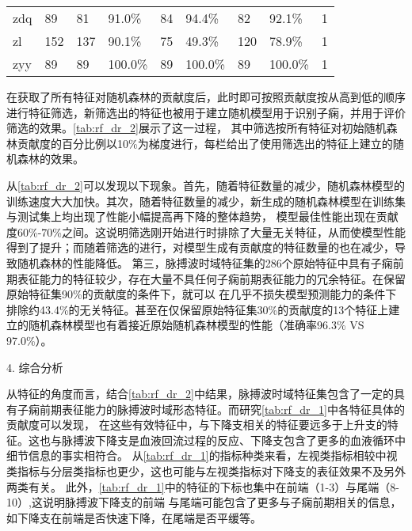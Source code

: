 \begin{landscape}
\begin{longtable}{m{2cm}<{\centering}m{2cm}<{\centering}m{2cm}<{\centering}m{2cm}<{\centering}m{2cm}<{\centering}m{2cm}<{\centering}m{2cm}<{\centering}m{2cm}<{\centering}m{2cm}<{\centering}}
            zdq                   & 89                    & 81         & 91.0\%     & 84         & 94.4\%     & 82         & 92.1\%      & 1                                                                      \\
            zl                    & 152                   & 137        & 90.1\%     & 75         & 49.3\%     & 120        & 78.9\%      & 1                                                                      \\
            zyy                   & 89                    & 89         & 100.0\%    & 89         & 100.0\%    & 89         & 100.0\%     & 1                                                                       \\    
      \end{longtable}
\end{landscape}

在获取了所有特征对随机森林的贡献度后，此时即可按照贡献度按从高到低的顺序进行特征筛选，新筛选出的特征也被用于建立随机模型用于识别子痫，并用于评价筛选的效果。\autoref{tab:rf_dr_2}展示了这一过程，
其中筛选按所有特征对初始随机森林贡献度的百分比例以10\%为梯度进行，每栏给出了使用筛选出的特征上建立的随机森林的效果。

从\autoref{tab:rf_dr_2}可以发现以下现象。首先，随着特征数量的减少，随机森林模型的训练速度大大加快。其次，随着特征数量的减少，新生成的随机森林模型在训练集与测试集上均出现了性能小幅提高再下降的整体趋势，
模型最佳性能出现在贡献度60\%-70\%之间。这说明筛选刚开始进行时排除了大量无关特征，从而使模型性能得到了提升；而随着筛选的进行，对模型生成有贡献度的特征数量的也在减少，导致随机森林的性能降低。
第三，脉搏波时域特征集的286个原始特征中具有子痫前期表征能力的特征较少，存在大量不具任何子痫前期表征能力的冗余特征。在保留原始特征集90\%的贡献度的条件下，就可以
在几乎不损失模型预测能力的条件下排除约43.4\%的无关特征。甚至在仅保留原始特征集30\%的贡献度的13个特征上建立的随机森林模型也有着接近原始随机森林模型的性能（准确率96.3\% VS 97.0\%）。

4. 综合分析

从特征的角度而言，结合\autoref{tab:rf_dr_2}中结果，脉搏波时域特征集包含了一定的具有子痫前期表征能力的脉搏波时域形态特征。而研究\autoref{tab:rf_dr_1}中各特征具体的贡献度可以发现，
在这些有效特征中，与下降支相关的特征要远多于上升支的特征。这也与脉搏波下降支是血液回流过程的反应、下降支包含了更多的血液循环中细节信息的事实相符合。
从\autoref{tab:rf_dr_1}的指标种类来看，左视类指标相较中视类指标与分层类指标也更少，这也可能与左视类指标对下降支的表征效果不及另外两类有关。
此外，\autoref{tab:rf_dr_1}中的特征的下标也集中在前端（1-3）与尾端（8-10）,这说明脉搏波下降支的前端
与尾端可能包含了更多与子痫前期相关的信息，如下降支在前端是否快速下降，在尾端是否平缓等。

